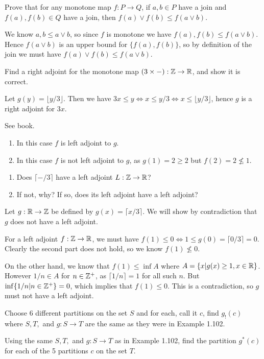 Prove that for any monotone map $f:P\to Q$, if $a, b\in P$ have a join and $f(a), f(b)\in Q$ have a join, then $f(a)\lor f(b)\leq f(a\lor b)$.

\solution
We know $a,b\leq a\lor b$, so since $f$ is monotone we have $f(a), f(b)\leq f(a\lor b)$.  Hence $f(a\lor b)$ is an upper bound for $\{f(a), f(b)\}$, so by definition of the join we must have $f(a)\lor f(b)\leq f(a\lor b)$.

Find a right adjoint for the monotone map $(3\times -):\mathbb{Z}\to\mathbb{R}$, and show it is correct.

\solution
Let $g(y) = \lfloor y/3 \rfloor$.  Then we have $3x \leq y \iff x\leq y/3 \iff x\leq \lfloor y/3\rfloor$, hence $g$ is a right adjoint for $3x$.

See book.

\solution
\begin{enumerate}
	\item In this case $f$ is left adjoint to $g$.
	\item In this case $f$ is not left adjoint to $g$, as $g(1)=2\geq 2$ but $f(2)=2\nleq 1$.
\end{enumerate}

\begin{enumerate}
	\item Does $\lceil -/3\rceil$ have a left adjoint $L:\mathbb{Z}\to\mathbb{R}$?
	\item If not, why?  If so, does its left adjoint have a left adjoint?
\end{enumerate}

\solution
Let $g:\mathbb{R}\to\mathbb{Z}$ be defined by $g(x)=\lceil x/3 \rceil$.  We will show by contradiction that $g$ does not have a left adjoint.

For a left adjoint $f:\mathbb{Z}\to\mathbb{R}$, we must have $f(1)\leq 0 \iff 1\leq g(0)=\lceil 0/3\rceil=0$.  Clearly the second part does not hold, so we know $f(1)\nleq 0$.

On the other hand, we know that $f(1)\leq \inf A$ where $A=\{x | g(x)\geq 1, x\in\mathbb{R}\}$.  However $1/n\in A$ for $n\in\mathbb{Z}^+$, as $\lceil 1/n\rceil = 1$ for all such $n$.  But $\inf\{1/n | n\in\mathbb{Z}^+\}=0$, which implies that $f(1)\leq 0$.  This is a contradiction, so $g$ must not have a left adjoint.

Choose 6 different partitions on the set $S$ and for each, call it $c$, find $g_!(c)$ where $S, T,$ and $g:S\to T$ are the same as they were in Example 1.102.

Using the same $S, T,$ and $g:S\to T$ as in Example 1.102, find the partition $g^*(c)$ for each of the 5 partitions $c$ on the set $T$.

